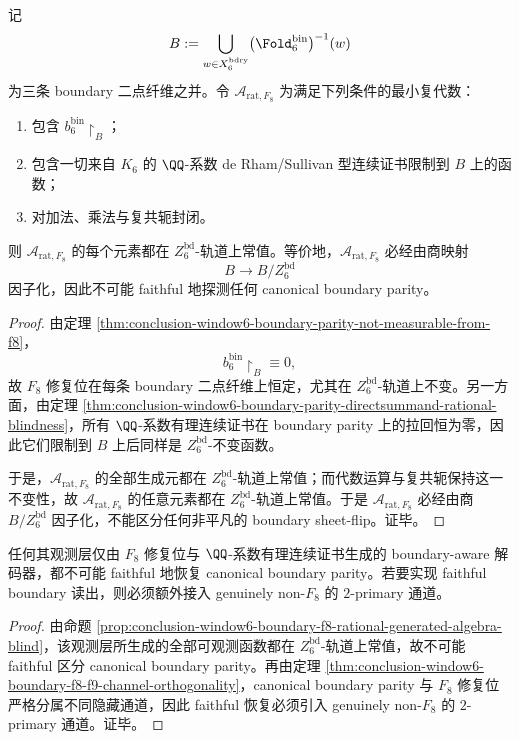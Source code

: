 \begin{proposition}\label{prop:conclusion-window6-boundary-f8-rational-generated-algebra-blind}
记
\[
B:=\bigcup_{w\in X_6^{\mathrm{bdry}}}\bigl(\Fold_6^{\mathrm{bin}}\bigr)^{-1}(w)
\]
为三条 boundary 二点纤维之并。令 \(\mathcal A_{\mathrm{rat},F_8}\) 为满足下列条件的最小复代数：
\begin{enumerate}
  \item 包含 \(b_6^{\mathrm{bin}}\!\restriction_B\)；
  \item 包含一切来自 \(K_6\) 的 \(\QQ\)-系数 de Rham/Sullivan 型连续证书限制到 \(B\) 上的函数；
  \item 对加法、乘法与复共轭封闭。
\end{enumerate}
则 \(\mathcal A_{\mathrm{rat},F_8}\) 的每个元素都在 \(Z_6^{\mathrm{bd}}\)-轨道上常值。等价地，\(\mathcal A_{\mathrm{rat},F_8}\) 必经由商映射
\[
B\longrightarrow B/Z_6^{\mathrm{bd}}
\]
因子化，因此不可能 faithful 地探测任何 canonical boundary parity。
\end{proposition}
\begin{proof}
由定理 \ref{thm:conclusion-window6-boundary-parity-not-measurable-from-f8}，
\[
b_6^{\mathrm{bin}}\!\restriction_B\equiv 0,
\]
故 \(F_8\) 修复位在每条 boundary 二点纤维上恒定，尤其在 \(Z_6^{\mathrm{bd}}\)-轨道上不变。另一方面，由定理 \ref{thm:conclusion-window6-boundary-parity-directsummand-rational-blindness}，所有 \(\QQ\)-系数有理连续证书在 boundary parity 上的拉回恒为零，因此它们限制到 \(B\) 上后同样是 \(Z_6^{\mathrm{bd}}\)-不变函数。

于是，\(\mathcal A_{\mathrm{rat},F_8}\) 的全部生成元都在 \(Z_6^{\mathrm{bd}}\)-轨道上常值；而代数运算与复共轭保持这一不变性，故 \(\mathcal A_{\mathrm{rat},F_8}\) 的任意元素都在 \(Z_6^{\mathrm{bd}}\)-轨道上常值。于是 \(\mathcal A_{\mathrm{rat},F_8}\) 必经由商 \(B/Z_6^{\mathrm{bd}}\) 因子化，不能区分任何非平凡的 boundary sheet-flip。证毕。
\end{proof}

\begin{corollary}\label{cor:conclusion-window6-boundary-f8-rational-observable-decoder-fails}
任何其观测层仅由 \(F_8\) 修复位与 \(\QQ\)-系数有理连续证书生成的 boundary-aware 解码器，都不可能 faithful 地恢复 canonical boundary parity。若要实现 faithful boundary 读出，则必须额外接入 genuinely non-\(F_8\) 的 \(2\)-primary 通道。
\end{corollary}
\begin{proof}
由命题 \ref{prop:conclusion-window6-boundary-f8-rational-generated-algebra-blind}，该观测层所生成的全部可观测函数都在 \(Z_6^{\mathrm{bd}}\)-轨道上常值，故不可能 faithful 区分 canonical boundary parity。再由定理 \ref{thm:conclusion-window6-boundary-f8-f9-channel-orthogonality}，canonical boundary parity 与 \(F_8\) 修复位严格分属不同隐藏通道，因此 faithful 恢复必须引入 genuinely non-\(F_8\) 的 \(2\)-primary 通道。证毕。
\end{proof}

